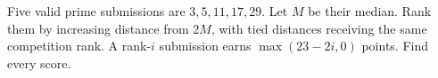 Five valid prime submissions are $3,5,11,17,29$. Let $M$ be their median. Rank them by increasing distance from $2M$, with tied distances receiving the same competition rank. A rank-$i$ submission earns $\max(23-2i,0)$ points. Find every score.
